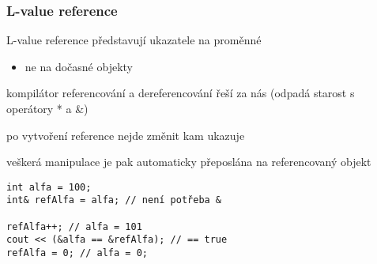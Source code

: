 
\begin{frame}[fragile]
\frametitle{L-value reference}

\begin{bitemize}
\item L-value reference představují ukazatele na  proměnné
\begin{itemize}
\item ne na dočasné objekty
\end{itemize}
\item kompilátor referencování a dereferencování řeší za nás (odpadá starost s operátory * a \&)
\item po vytvoření reference nejde změnit kam ukazuje
\item veškerá manipulace je pak automaticky přeposlána na referencovaný objekt
\end{bitemize}

\begin{yesblock}
\begin{lstlisting}[basicstyle=\small]
int alfa = 100;
int& refAlfa = alfa; // není potřeba &

refAlfa++; // alfa = 101
cout << (&alfa == &refAlfa); // == true
refAlfa = 0; // alfa = 0;
\end{lstlisting}
\end{yesblock}
\end{frame}


